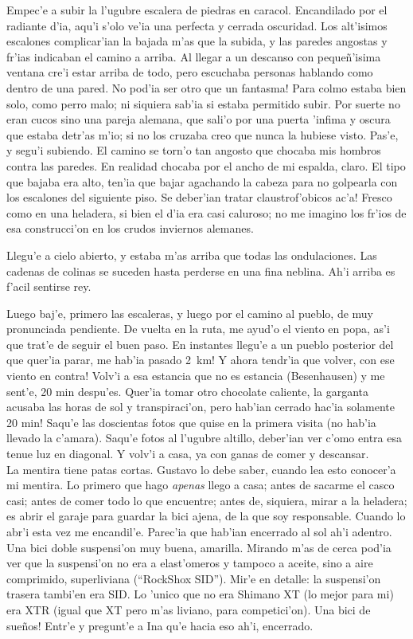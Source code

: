 Empec'e a subir la l'ugubre escalera de piedras en caracol. Encandilado por el
radiante d'ia, aqu'i s'olo ve'ia una perfecta y cerrada oscuridad. Los
alt'isimos escalones complicar'ian la bajada m'as que la subida, y las paredes
angostas y fr'ias indicaban el camino a arriba. Al llegar a un descanso con
peque\~n'isima ventana cre'i estar arriba de todo, pero escuchaba personas
hablando como dentro de una pared. \textexclamdown No pod'ia ser otro que un
fantasma! Para colmo estaba bien solo, como perro malo; ni siquiera sab'ia si
estaba permitido subir. Por suerte no eran cucos sino una pareja alemana, que
sali'o por una puerta 'infima y oscura que estaba detr'as m'io; si no los
cruzaba creo que nunca la hubiese visto. Pas'e, y segu'i subiendo. El camino se
torn'o tan angosto que chocaba mis hombros contra las paredes. En realidad
chocaba por el ancho de mi espalda, claro. El tipo que bajaba era alto, ten'ia
que bajar agachando la cabeza para no golpearla con los escalones del siguiente
piso. \textexclamdown Se deber'ian tratar claustrof'obicos ac'a! Fresco como en
una heladera, si bien el d'ia era casi caluroso; no me imagino los fr'ios de esa
construcci'on en los crudos inviernos alemanes.

Llegu'e a cielo abierto, y estaba m'as arriba que todas las ondulaciones. Las
cadenas de colinas se suceden hasta perderse en una fina neblina. Ah'i arriba es
f'acil sentirse rey.

Luego baj'e, primero las escaleras, y luego por el camino al pueblo, de muy
pronunciada pendiente. De vuelta en la ruta, me ayud'o el viento en popa, as'i
que trat'e de seguir el buen paso. En instantes llegu'e a un pueblo posterior
del que quer'ia parar, \textexclamdown me hab'ia pasado 2~km! \textexclamdown Y
ahora tendr'ia que volver, con ese viento en contra! Volv'i a esa estancia que
no es estancia (Besenhausen) y me sent'e, 20 min despu'es. Quer'ia tomar otro
chocolate caliente, la garganta acusaba las horas de sol y transpiraci'on,
\textexclamdown pero hab'ian cerrado hac'ia solamente 20 min! Saqu'e las
doscientas fotos que quise en la primera visita (no hab'ia llevado la c'amara).
Saqu'e fotos al l'ugubre altillo, deber'ian ver c'omo entra esa tenue luz en
diagonal. Y volv'i a casa, ya con ganas de comer y descansar.\\

La mentira tiene patas cortas. Gustavo lo debe saber, cuando lea esto conocer'a
mi mentira. Lo primero que hago \emph{apenas} llego a casa; antes de sacarme el
casco casi; antes de comer todo lo que encuentre; antes de, siquiera, mirar a la
heladera; es abrir el garaje para guardar la bici ajena, de la que soy
responsable. Cuando lo abr'i esta vez me encandil'e. Parec'ia que hab'ian
encerrado al sol ah'i adentro. Una bici doble suspensi'on muy buena, amarilla.
Mirando m'as de cerca pod'ia ver que la suspensi'on no era a elast'omeros y
tampoco a aceite, sino a aire comprimido, superliviana (``RockShox {\small
SID}''). Mir'e en detalle: la suspensi'on trasera tambi'en era {\small SID}. Lo
'unico que no era Shimano {\small XT} (lo mejor para mi) era {\small XTR} (igual
que {\small XT} pero m'as liviano, para competici'on). \textexclamdown Una bici
de sue\~nos! Entr'e y pregunt'e a Ina qu'e hacia eso ah'i, encerrado.

